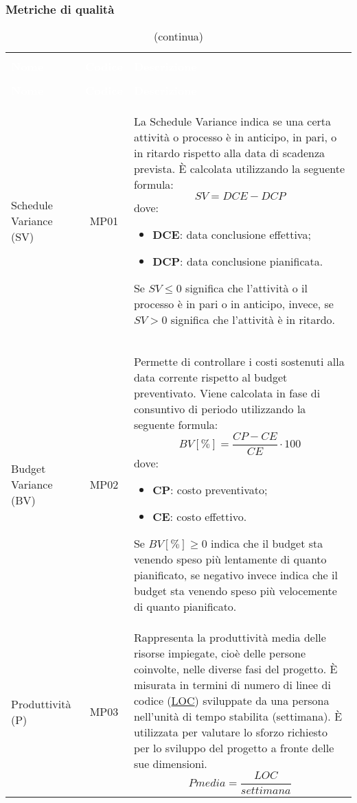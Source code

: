 \subsubsection{Metriche di qualità}
\begin{longtable}{ C{4.5cm} c L{9.5cm} }
	\caption{Metriche di qualità dei processi}\\
		\textcolor{white}{\textbf{Nome}} & \textcolor{white}{\textbf{Codice}} & \centerline{\textcolor{white}{\textbf{Descrizione}}} \\
		\endfirsthead
		\caption[]{(continua)} \\
		\textcolor{white}{\textbf{Nome}} & \textcolor{white}{\textbf{Codice}} & \centerline{\textcolor{white}{\textbf{Descrizione}}} \\
		\endhead
		Schedule Variance (SV)  & MP01 & La Schedule Variance indica se una certa attività o processo è in anticipo, in pari, o in ritardo rispetto alla data di scadenza prevista. È calcolata utilizzando la seguente formula: \newline
\[ SV = DCE-DCP\]
dove: \begin{itemize}
\item \textbf{DCE}: data conclusione effettiva;
\item \textbf{DCP}: data conclusione pianificata.
\end{itemize}
Se $SV \leq 0$ significa che l'attività o il processo è in pari o in anticipo, invece, se $SV > 0$ significa che l'attività è in ritardo. \\	
		Budget Variance (BV) & MP02 & Permette di controllare i costi sostenuti alla data corrente rispetto al budget preventivato. Viene calcolata in fase di consuntivo di periodo utilizzando la seguente formula: \newline
		\[ BV[\%] = \frac{CP-CE}{CE}\cdot 100 \]		
dove: \begin{itemize}
\item \textbf{CP}: costo preventivato;
\item \textbf{CE}: costo effettivo.
\end{itemize}
Se $BV[\%] \geq 0$ indica che il budget sta venendo speso più lentamente di quanto pianificato, se negativo invece indica che il budget sta venendo speso più velocemente di quanto pianificato. \\
Produttività (P) & MP03 & Rappresenta la produttività media delle risorse impiegate, cioè delle persone coinvolte, nelle diverse fasi del progetto. È misurata in termini di numero di linee di codice (\hyperref[par:MS01]{LOC}) sviluppate da una persona nell’unità di tempo stabilita (settimana). È utilizzata per valutare lo sforzo richiesto per lo sviluppo  del progetto a fronte delle sue dimensioni. 
\[ Pmedia = \frac{LOC}{settimana}\]
	\end{longtable}

